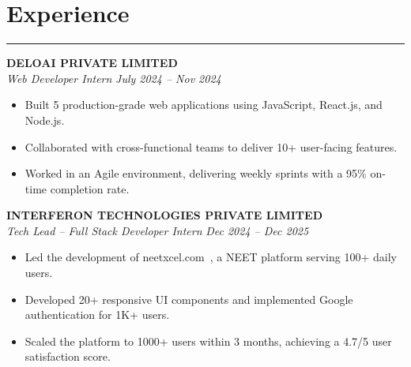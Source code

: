 \documentclass[a4paper,10pt]{article}
\begin{document}

\vspace{6pt}
\section*{Experience}
\rule{\linewidth}{0.4pt}

\textbf{DELOAI PRIVATE LIMITED} \\
\textit{Web Developer Intern} \hfill \textit{July 2024 -- Nov 2024}
\begin{itemize}
  \item Built 5 production-grade web applications using JavaScript, React.js, and Node.js.
  \item Collaborated with cross-functional teams to deliver 10+ user-facing features.
  \item Worked in an Agile environment, delivering weekly sprints with a 95\% on-time completion rate.
\end{itemize}

\vspace{2pt}

\textbf{INTERFERON TECHNOLOGIES PRIVATE LIMITED} \\
\textit{Tech Lead -- Full Stack Developer Intern} \hfill \textit{Dec 2024 -- Dec 2025}
\begin{itemize}
   \item Led the development of neetxcel.com~\href{https://neetxcel.com/}{\faExternalLink}, a NEET platform serving 100+ daily users.
  \item Developed 20+ responsive UI components and implemented Google authentication for 1K+ users.
  \item Scaled the platform to 1000+ users within 3 months, achieving a 4.7/5 user satisfaction score.
\end{itemize}
\end{document}

